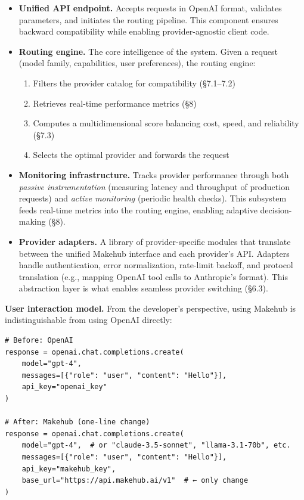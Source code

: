 \documentclass[english]{article}
\begin{document}
\begin{itemize}
\item \textbf{Unified API endpoint.} Accepts requests in OpenAI format, validates parameters, and initiates the routing pipeline. This component ensures backward compatibility while enabling provider-agnostic client code.

\item \textbf{Routing engine.} The core intelligence of the system. Given a request (model family, capabilities, user preferences), the routing engine:
  \begin{enumerate}[label=(\alph*)]
    \item Filters the provider catalog for compatibility (§7.1--7.2)
    \item Retrieves real-time performance metrics (§8)
    \item Computes a multidimensional score balancing cost, speed, and reliability (§7.3)
    \item Selects the optimal provider and forwards the request
  \end{enumerate}

\item \textbf{Monitoring infrastructure.} Tracks provider performance through both \emph{passive instrumentation} (measuring latency and throughput of production requests) and \emph{active monitoring} (periodic health checks). This subsystem feeds real-time metrics into the routing engine, enabling adaptive decision-making (§8).

\item \textbf{Provider adapters.} A library of provider-specific modules that translate between the unified Makehub interface and each provider's API. Adapters handle authentication, error normalization, rate-limit backoff, and protocol translation (e.g., mapping OpenAI tool calls to Anthropic's format). This abstraction layer is what enables seamless provider switching (§6.3).
\end{itemize}

\medskip

\noindent\textbf{User interaction model.}
From the developer's perspective, using Makehub is indistinguishable from using OpenAI directly:

\begin{verbatim}
# Before: OpenAI
response = openai.chat.completions.create(
    model="gpt-4",
    messages=[{"role": "user", "content": "Hello"}],
    api_key="openai_key"
)

# After: Makehub (one-line change)
response = openai.chat.completions.create(
    model="gpt-4",  # or "claude-3.5-sonnet", "llama-3.1-70b", etc.
    messages=[{"role": "user", "content": "Hello"}],
    api_key="makehub_key",
    base_url="https://api.makehub.ai/v1"  # ← only change
)
\end{verbatim}
\end{document}

